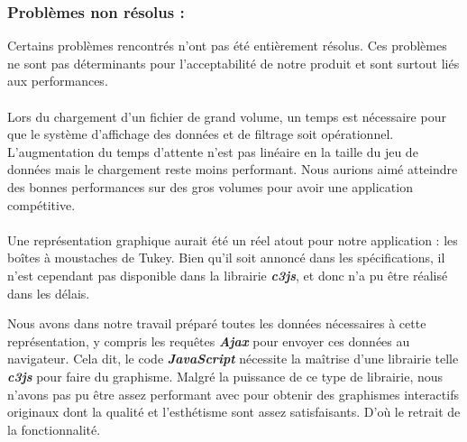 			\subsubsection*{Problèmes non résolus :}
				Certains problèmes rencontrés n'ont pas été entièrement résolus. Ces problèmes ne sont pas déterminants pour l'acceptabilité de notre produit et sont surtout liés aux performances.
				\paragraph{}Lors du chargement d'un fichier de grand volume, un temps est nécessaire pour que le système d'affichage des données et de filtrage soit opérationnel. L'augmentation du temps d'attente n'est pas linéaire en la taille du jeu de données mais le chargement reste moins performant. Nous aurions aimé atteindre des bonnes performances sur des gros volumes pour avoir une application compétitive.
				\paragraph{}Une représentation graphique aurait été un réel atout pour notre application : les boîtes à moustaches de Tukey.
				Bien qu'il soit annoncé dans les spécifications, il n'est cependant pas disponible dans la librairie \textit{\textbf{c3js}}, et donc n'a pu être réalisé dans les délais.
						
				Nous avons dans notre travail préparé toutes les données nécessaires à cette représentation, y compris les requêtes \textit{\textbf{Ajax}} pour envoyer ces données au navigateur. Cela dit, le code \textit{\textbf{JavaScript}} nécessite la maîtrise d'une librairie telle \textit{\textbf{c3js}} pour faire du graphisme. Malgré la puissance de ce type de librairie, nous n'avons pas pu être assez performant avec pour obtenir des graphismes interactifs originaux dont la qualité et l'esthétisme sont assez satisfaisants. D'où le retrait de la fonctionnalité.
		
				
